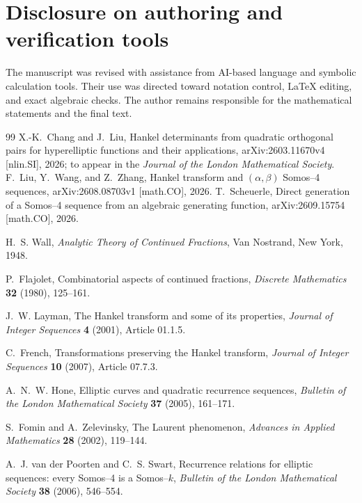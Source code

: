 \documentclass[11pt]{article}
\theoremstyle{definition}
\theoremstyle{remark}
\begin{document}
\section*{Disclosure on authoring and verification tools}
The manuscript was revised with assistance from AI-based language and symbolic
calculation tools.  Their use was directed toward notation control, LaTeX
editing, and exact algebraic checks.  The author remains responsible for the
mathematical statements and the final text.

\begin{thebibliography}{99}
X.-K.~Chang and J.~Liu,
\newblock Hankel determinants from quadratic orthogonal pairs for hyperelliptic functions and their applications,
\newblock arXiv:2603.11670v4 [nlin.SI], 2026; to appear in the \emph{Journal of the London Mathematical Society}.
F.~Liu, Y.~Wang, and Z.~Zhang,
\newblock Hankel transform and $(\alpha,\beta)$ Somos--4 sequences,
\newblock arXiv:2608.08703v1 [math.CO], 2026.
T.~Scheuerle,
\newblock Direct generation of a Somos--4 sequence from an algebraic generating function,
\newblock arXiv:2609.15754 [math.CO], 2026.

H.~S. Wall,
\newblock \emph{Analytic Theory of Continued Fractions},
\newblock Van Nostrand, New York, 1948.

P.~Flajolet,
\newblock Combinatorial aspects of continued fractions,
\newblock \emph{Discrete Mathematics} \textbf{32} (1980), 125--161.

J.~W. Layman,
\newblock The Hankel transform and some of its properties,
\newblock \emph{Journal of Integer Sequences} \textbf{4} (2001), Article 01.1.5.

C.~French,
\newblock Transformations preserving the Hankel transform,
\newblock \emph{Journal of Integer Sequences} \textbf{10} (2007), Article 07.7.3.

A.~N.~W. Hone,
\newblock Elliptic curves and quadratic recurrence sequences,
\newblock \emph{Bulletin of the London Mathematical Society} \textbf{37} (2005), 161--171.

S.~Fomin and A.~Zelevinsky,
\newblock The Laurent phenomenon,
\newblock \emph{Advances in Applied Mathematics} \textbf{28} (2002), 119--144.

A.~J. van der Poorten and C.~S. Swart,
\newblock Recurrence relations for elliptic sequences: every Somos--4 is a Somos--$k$,
\newblock \emph{Bulletin of the London Mathematical Society} \textbf{38} (2006), 546--554.
\end{thebibliography}
\end{document}
